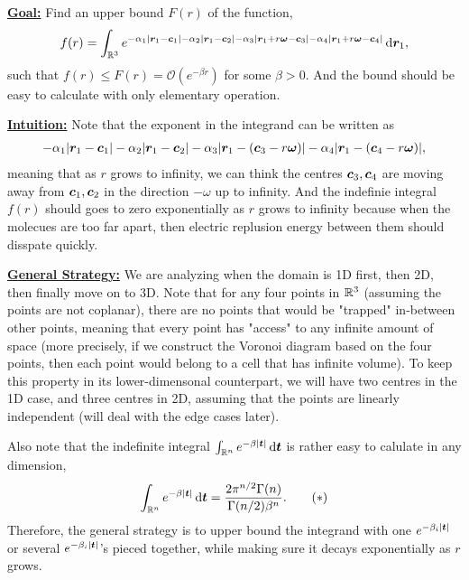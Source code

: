\documentclass[12pt]{article}
\begin{document}
\underline{\textbf{Goal:}} Find an upper bound \(F(r)\) of the function,
\begin{align*}
    f(r) = \int_{\mathbb {R}^3} e^{-\alpha_1|\bm{r}_1 - \bm{c}_1| - \alpha_2|\bm{r}_1 - \bm{c}_2|-\alpha_3|\bm{r}_1 + r\bm{\omega} - \bm{c}_3|-\alpha_4|\bm{r}_1 + r\bm{\omega} - \bm{c}_4|} \mathop{}\!\mathrm{d} \bm{r}_1,
\end{align*}
such that \(f(r) \leq F(r) = \mathcal{O}(e^{-\beta r})\) for some \(\beta > 0\). And the bound should be easy to calculate with only elementary operation.

\underline{\textbf{Intuition:}} Note that the exponent in the integrand can be written as 
\begin{align*}
    -\alpha_1|\bm{r}_1 - \bm{c}_1| - \alpha_2|\bm{r}_1 - \bm{c}_2|-\alpha_3|\bm{r}_1 - (\bm{c}_3-r\bm{\omega})|-\alpha_4|\bm{r}_1 - (\bm{c}_4 - r\bm{\omega})|,
\end{align*} 
meaning that as \(r\) grows to infinity, we can think the centres \(\bm{c}_3, \bm{c}_4\) are moving away from \(\bm{c}_1, \bm{c}_2\) in the direction \(-\omega\) up to infinity. And the indefinie integral \(f(r)\) should goes to zero exponentially as \(r\) grows to infinity because when the molecues are too far apart, then electric replusion energy between them should disspate quickly.

\underline{\textbf{General Strategy:}} 
We are analyzing when the domain is 1D first, then 2D, then finally move on to 3D. 
Note that for any four points in \(\mathbb {R}^3\) (assuming the points are not coplanar), there are no points that would be "trapped" in-between other points, meaning that every point has "access" to any infinite amount of space (more precisely, if we construct the Voronoi diagram based on the four points, then each point would belong to a cell that has infinite volume).
To keep this property in its lower-dimensonal counterpart, we will have two centres in the 1D case, and three centres in 2D, assuming that the points are linearly independent (will deal with the edge cases later).

Also note that the indefinite integral \(\int_{\mathbb {R}^n} e^{-\beta |\bm{t}|} \mathop{}\!\mathrm{d} \bm{t}\) is rather easy to calulate in any dimension,
\begin{align*}
    \int_{\mathbb {R}^n} e^{-\beta |\bm{t}|} \mathop{}\!\mathrm{d} \bm{t} = \frac{2 \pi^{n/2}\Gamma(n)}{\Gamma(n/2) \beta^n}. \tag{\(\ast\)}
\end{align*}
Therefore, the general strategy is to upper bound the integrand with one \(e^{-\beta_i|\bm{t}|}\) or several \(e^{-\beta_i|\bm{t}|}\)'s pieced together, while making sure it decays exponentially as \(r\) grows.
\end{document}
